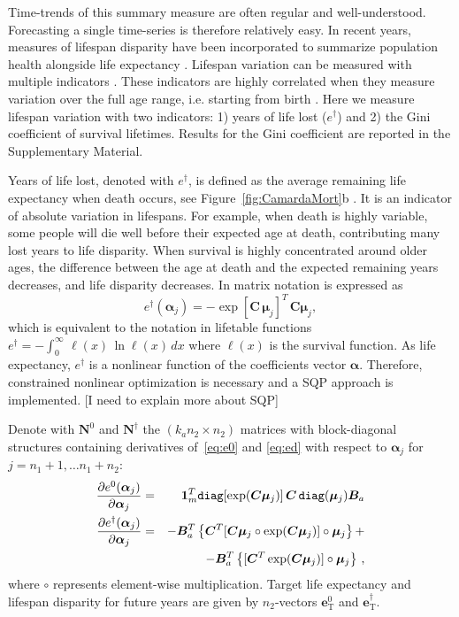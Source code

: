 \documentclass[a4paper,twoside, openright, 12pt, leqno]{article}
\begin{document}
Time-trends of this summary measure are often regular and well-understood. Forecasting a single time-series is therefore relatively easy. In recent years, measures of lifespan disparity have been incorporated to summarize population health alongside life expectancy \citep{van2018case}. Lifespan variation can be measured with multiple indicators \citep{vanRaalte2013}. These indicators are highly correlated when they measure variation over the full age range, i.e. starting from birth \citep{colchero2016emergence}. Here we measure lifespan variation with two indicators: 1) years of life lost ($e^\dagger$) and 2) the Gini coefficient of survival lifetimes. Results for the Gini coefficient are reported in the Supplementary Material.

Years of life lost, denoted with $e^\dagger$, is defined as the average remaining life expectancy when death occurs, see Figure~\ref{fig:CamardaMort}b \citep{Vaupel2003,Vaupel2011}. It is an indicator of absolute variation in lifespans. For example, when death is highly variable, some people will die well before their expected age at death, contributing many lost years to life disparity. When survival is highly concentrated around older ages, the difference between the age at death and the expected remaining years decreases, and life disparity decreases. In matrix notation is expressed as 
%
\begin{equation}\label{eq:ed}
e^{\dagger} (\bm{\alpha}_{j}) =  - \exp[ \bm{C} \, \bm{\mu}_{j}]^{T} \, \bm{C} \bm{\mu}_{j},
\end{equation} 
%
which is equivalent to the notation in lifetable functions $e^\dagger = -\int_0^\infty\, \ell(x)\,\ln{\ell(x)}\, dx
$ where $\ell(x)$ is the survival function. As life expectancy, $e^\dagger$ is a nonlinear function of the coefficients vector $\bm{\alpha}$. Therefore, constrained nonlinear optimization is necessary and a SQP approach is implemented. [I need to explain more about SQP]


 
Denote with $\bm{N}^{0}$ and $\bm{N}^{\dagger}$ the $(k_{a}n_{2} \times n_{2})$ matrices with block-diagonal structures containing derivatives of~\eqref{eq:e0} and \eqref{eq:ed} with respect to $\bm{\alpha}_{j}$ for $j=n_{1}+1, \ldots n_{1}+n_{2}$:
\begin{eqnarray}\label{eq:Der}
\frac{\partial e^{0} (\bm{\alpha}_{j})}{\partial \bm{\alpha}_{j}} &=& \bm{1}_{m}^{T} \verb"diag"[\exp(\bm{C}\bm{\mu}_{j})] \,	\bm{C} \,\verb"diag"(\bm{\mu}_{j}) \bm{B}_{a}\\
\frac{\partial e^{\dagger} (\bm{\alpha}_{j})}{\partial \bm{\alpha}_{j}} &=& - \bm{B}_{a}^{T} \left\{ \bm{C}^{T}[\bm{C}\bm{\mu}_{j} \circ \exp(\bm{C}\bm{\mu}_{j})] \circ \bm{\mu}_{j} \right\} + \nonumber\\
&& - \bm{B}_{a}^{T} \left\{ [\bm{C}^{T} \exp(\bm{C}\bm{\mu}_{j})] \circ \bm{\mu}_{j} \right\} \nonumber\, ,
\end{eqnarray}
where $\circ$ represents element-wise multiplication. Target life expectancy and lifespan disparity for future years are given by $n_{2}$-vectors $\bm{e}^{0}_{\mathrm{T}}$ and $\bm{e}^{\dagger}_{\mathrm{T}}$.
\end{document}

